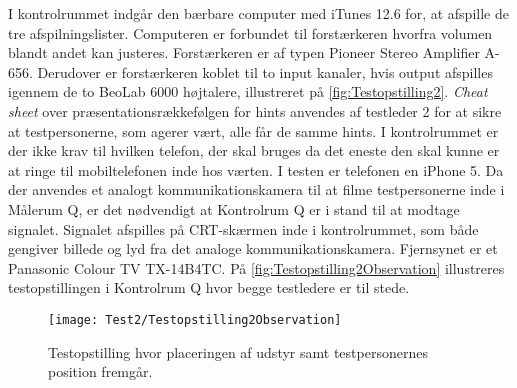 %
I kontrolrummet indgår den bærbare computer med iTunes 12.6 for, at afspille de tre afspilningslister. Computeren er forbundet til forstærkeren hvorfra volumen blandt andet kan justeres. Forstærkeren er af typen Pioneer Stereo Amplifier A-656. Derudover er forstærkeren koblet til to input kanaler, hvis output afspilles igennem de to BeoLab 6000 højtalere, illustreret på \autoref{fig:Testopstilling2}. \textit{Cheat sheet} over præsentationsrækkefølgen for hints anvendes af testleder 2 for at sikre at testpersonerne, som agerer vært, alle får de samme hints. I kontrolrummet er der ikke krav til hvilken telefon, der skal bruges da det eneste den skal kunne er at ringe til mobiltelefonen inde hos værten. I testen er telefonen en iPhone 5. Da der anvendes et analogt kommunikationskamera til at filme testpersonerne inde i Målerum Q, er det nødvendigt at Kontrolrum Q er i stand til at modtage signalet. Signalet afspilles på CRT-skærmen inde i kontrolrummet, som både gengiver billede og lyd fra det analoge kommunikationskamera. Fjernsynet er et Panasonic Colour TV TX-14B4TC. På \autoref{fig:Testopstilling2Observation} illustreres testopstillingen i Kontrolrum Q hvor begge testledere er til stede.   
%
\begin{figure}[H]
	\centering
	\texttt{[image: Test2/Testopstilling2Observation]}
	\caption{Testopstilling hvor placeringen af udstyr samt testpersonernes position fremgår.}
	\label{fig:Testopstilling2Observation}
\end{figure}
\noindent
% 


